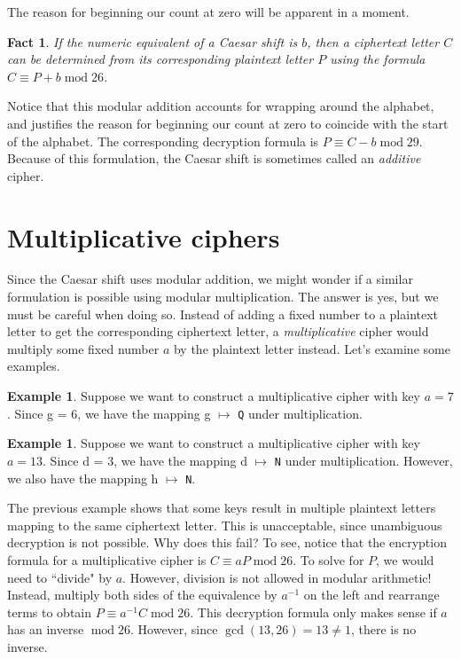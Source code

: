 \documentclass{book}
\theoremstyle{plain}
\newtheorem{fact}[theorem]{Fact}
\theoremstyle{definition}
\newtheorem{example}[theorem]{Example}
\newcommand{\ciphertext}[1]{\texttt{#1}} %
\renewcommand{\mod}{\operatorname{mod}}
\renewcommand{\mod}{\operatorname{mod}}
\begin{document}
The reason for beginning our count at zero will be apparent in a moment.

\begin{fact}
If the numeric equivalent of a Caesar shift is $b$, then a ciphertext letter $C$ can be determined from its corresponding plaintext letter $P$ using the formula $C \equiv P + b \mod 26$.
\end{fact}

Notice that this modular addition accounts for wrapping around the alphabet, and justifies the reason for beginning our count at zero to coincide with the start of the alphabet. The corresponding decryption formula is $P \equiv C - b \mod 29$. Because of this formulation, the Caesar shift is sometimes called an {\it additive} cipher.

\section{Multiplicative ciphers}
Since the Caesar shift uses modular addition, we might wonder if a similar formulation is possible using modular multiplication. The answer is yes, but we must be careful when doing so. Instead of adding a fixed number to a plaintext letter to get the corresponding ciphertext letter, a {\it multiplicative} cipher would multiply some fixed number $a$ by the plaintext letter instead. Let's examine some examples.

\begin{example}
Suppose we want to construct a multiplicative cipher with key $a = 7$. Since g = 6, we have the mapping g $\mapsto$ \ciphertext{Q} under multiplication.
\end{example}

\begin{example}
Suppose we want to construct a multiplicative cipher with key $a = 13$. Since d = 3, we have the mapping d $\mapsto$ \ciphertext{N} under multiplication. However, we also have the mapping h $\mapsto$ \ciphertext{N}.
\end{example}

The previous example shows that some keys result in multiple plaintext letters mapping to the same ciphertext letter. This is unacceptable, since unambiguous decryption is not possible. Why does this fail? To see, notice that the encryption formula for a multiplicative cipher is $C \equiv aP \mod 26$. To solve for $P$, we would need to ``divide" by $a$. However, division is not allowed in modular arithmetic! Instead, multiply both sides of the equivalence by $a^{-1}$ on the left and rearrange terms to obtain $P \equiv a^{-1}C \mod 26$. This decryption formula only makes sense if $a$ has an inverse $\mod 26$. However, since $\gcd(13,26) = 13 \neq 1$, there is no inverse.
\end{document}
